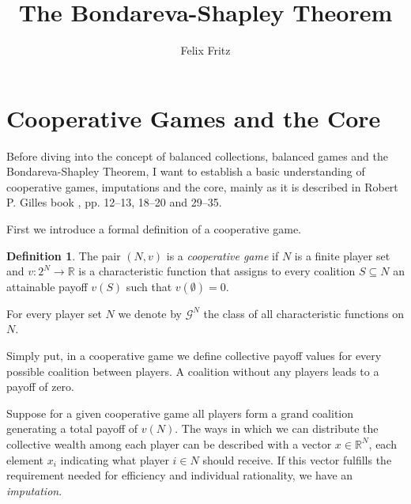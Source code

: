 \documentclass[10pt,a4paper,titlepage]{article}
\author{Felix Fritz}
\title{The Bondareva-Shapley Theorem}
\theoremstyle{plain}
\theoremstyle{definition}
\newtheorem{definition}[thm]{Definition} %
\begin{document}
\maketitle

\tableofcontents
\pagebreak

\section{Cooperative Games and the Core}
 Before diving into the concept of balanced collections, balanced games and the Bondareva-Shapley Theorem, I want to establish a basic understanding of cooperative games, imputations and the core, mainly as it is described in Robert P. Gilles book \cite{gilles}, pp. 12--13, 18--20 and 29--35.

 First we introduce a formal definition of a cooperative game.

\begin{definition}
    The pair $(N, v)$ is a \textit{cooperative game} if $N$ is a finite player set and $v: 2^N \rightarrow \mathbb{R}$ is a characteristic function that assigns to every coalition $S \subseteq N$ an attainable payoff $v(S)$ such that $v(\emptyset) = 0$.
    
    For every player set $N$ we denote by $\mathcal{G}^N$ the class of all characteristic functions on $N$.
\end{definition}
Simply put, in a cooperative game we define collective payoff values for every possible coalition between players. A coalition without any players leads to a payoff of zero.

Suppose for a given cooperative game all players form a grand coalition generating a total payoff of $v(N)$. The ways in which we can distribute the collective wealth among each player can be described with a vector $x \in \mathbb{R}^N$, each element $x_i$ indicating what player $i \in N$ should receive.
If this vector fulfills the requirement needed for efficiency and individual rationality, we have an \textit{imputation}.
\end{document}
